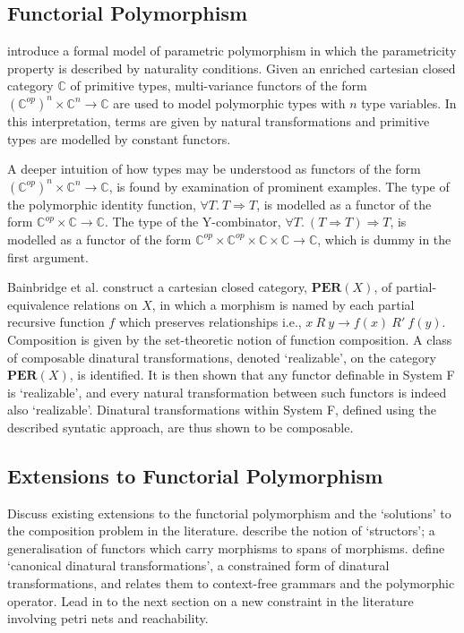 \documentclass[../../Dissertation.tex]{subfiles}
\begin{document}
\subsection{Functorial Polymorphism}
 introduce a formal model of parametric polymorphism in which the parametricity property is described by naturality conditions. Given an enriched cartesian closed category $\mathbb{C}$ of primitive types, multi-variance functors of the form $(\mathbb{C}^{op})^n \times \mathbb{C}^n \rightarrow \mathbb{C}$ are used to model polymorphic types with $n$ type variables. In this interpretation, terms are given by natural transformations and primitive types are modelled by constant functors.
\par
A deeper intuition of how types may be understood as functors of the form $(\mathbb{C}^{op})^n \times \mathbb{C}^n \rightarrow \mathbb{C}$, is found by examination of prominent examples. The type of the polymorphic identity function, $\forall T.\ T \Rightarrow T$, is modelled as a functor of the form $\mathbb{C}^{op} \times \mathbb{C} \rightarrow \mathbb{C}$. The type of the Y-combinator, $\forall T.\ (T \Rightarrow T) \Rightarrow T$, is modelled as a functor of the form $\mathbb{C}^{op} \times \mathbb{C}^{op} \times \mathbb{C} \times \mathbb{C} \rightarrow \mathbb{C}$, which is dummy in the first argument.
\par
Bainbridge et al. construct a cartesian closed category, $\mathbf{PER}(X)$, of partial-equivalence relations on $X$, in which a morphism is named by each partial recursive function $f$ which preserves relationships i.e., $x\ R\ y \rightarrow f(x)\ R'\ f(y)$. Composition is given by the set-theoretic notion of function composition. A class of composable dinatural transformations, denoted `realizable', on the category $\mathbf{PER}(X)$, is identified. It is then shown that any functor definable in System F is `realizable', and every natural transformation between such functors is indeed also `realizable'. Dinatural transformations within System F, defined using the described syntatic approach, are thus shown to be composable.

\subsection{Extensions to Functorial Polymorphism}
Discuss existing extensions to the functorial polymorphism and the `solutions' to the composition problem in the literature.
\newline\newline
{} describe the notion of `structors'; a generalisation of functors which carry morphisms to spans of morphisms.
\newline\newline
{} define `canonical dinatural transformations', a constrained form of dinatural transformations, and relates them to context-free grammars and the polymorphic operator.
\newline\newline
Lead in to the next section on a new constraint in the literature involving petri nets and reachability.
\end{document}
